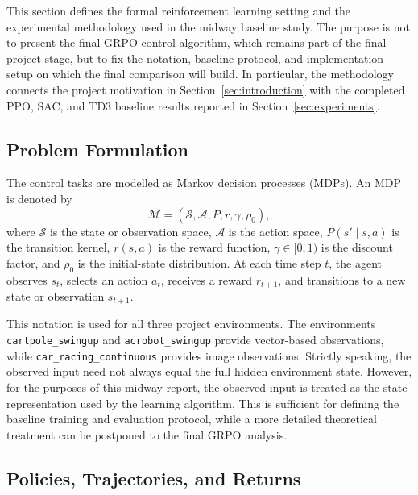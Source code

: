 
\label{sec:methodology}

This section defines the formal reinforcement learning setting and the experimental methodology used in the midway baseline study. The purpose is not to present the final GRPO-control algorithm, which remains part of the final project stage, but to fix the notation, baseline protocol, and implementation setup on which the final comparison will build. In particular, the methodology connects the project motivation in Section~\ref{sec:introduction} with the completed PPO, SAC, and TD3 baseline results reported in Section~\ref{sec:experiments}.

\subsection{Problem Formulation}
\label{sec:methodology-mdp}

The control tasks are modelled as Markov decision processes (MDPs). An MDP is denoted by
\[
\mathcal{M} = (\mathcal{S}, \mathcal{A}, P, r, \gamma, \rho_0),
\]
where $\mathcal{S}$ is the state or observation space, $\mathcal{A}$ is the action space, $P(s' \mid s,a)$ is the transition kernel, $r(s,a)$ is the reward function, $\gamma \in [0,1)$ is the discount factor, and $\rho_0$ is the initial-state distribution. At each time step $t$, the agent observes $s_t$, selects an action $a_t$, receives a reward $r_{t+1}$, and transitions to a new state or observation $s_{t+1}$.

This notation is used for all three project environments. The environments \texttt{cartpole\_swingup} and \texttt{acrobot\_swingup} provide vector-based observations, while \texttt{car\_racing\_continuous} provides image observations. Strictly speaking, the observed input need not always equal the full hidden environment state. However, for the purposes of this midway report, the observed input is treated as the state representation used by the learning algorithm. This is sufficient for defining the baseline training and evaluation protocol, while a more detailed theoretical treatment can be postponed to the final GRPO analysis.

\subsection{Policies, Trajectories, and Returns}
\label{sec:methodology-policies-returns}

